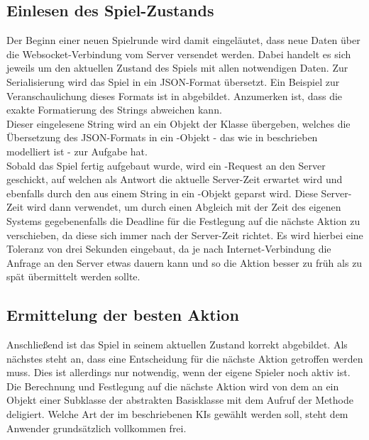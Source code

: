\subsection{Einlesen des Spiel-Zustands}
\label{subsec:einlesen-spielzustand}

Der Beginn einer neuen Spielrunde wird damit eingeläutet, dass neue Daten über die Websocket-Verbindung vom Server
versendet werden.
Dabei handelt es sich jeweils um den aktuellen Zustand des Spiels mit allen notwendigen Daten.
Zur Serialisierung wird das Spiel in ein JSON-Format übersetzt.
Ein Beispiel zur Veranschaulichung dieses Formats ist in  abgebildet.
Anzumerken ist, dass die exakte Formatierung des Strings abweichen kann. \\

Dieser eingelesene String wird an ein Objekt der Klasse  übergeben, welches die Übersetzung des
JSON-Formats in ein -Objekt - das wie in  beschrieben modelliert ist - zur Aufgabe
hat. \\

Sobald das Spiel fertig aufgebaut wurde, wird ein -Request an den Server geschickt, auf welchen als Antwort
die aktuelle Server-Zeit erwartet wird und ebenfalls durch den  aus einem String in ein
-Objekt geparst wird.
Diese Server-Zeit wird dann verwendet, um durch einen Abgleich mit der Zeit des eigenen Systems gegebenenfalls die
Deadline für die Festlegung auf die nächste Aktion zu verschieben, da diese sich immer nach der Server-Zeit richtet.
Es wird hierbei eine Toleranz von drei Sekunden eingebaut, da je nach Internet-Verbindung die Anfrage an den Server
etwas dauern kann und so die Aktion besser zu früh als zu spät übermittelt werden sollte.

\subsection{Ermittelung der besten Aktion}
\label{subsec:ermitteln-aktion}

Anschließend ist das Spiel in seinem aktuellen Zustand korrekt abgebildet.
Als nächstes steht an, dass eine Entscheidung für die nächste Aktion getroffen werden muss.
Dies ist allerdings nur notwendig, wenn der eigene Spieler noch aktiv ist. \\

Die Berechnung und Festlegung auf die nächste Aktion wird von dem  an ein Objekt einer
Subklasse der abstrakten Basisklasse  mit dem Aufruf der Methode
 deligiert.
Welche Art der im  beschriebenen \ac{KI}s gewählt werden soll, steht dem Anwender
grundsätzlich vollkommen frei.

